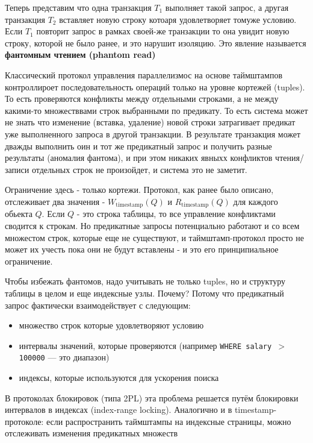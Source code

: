 Теперь представим что одна транзакция $T_1$ выполняет такой запрос, а другая транзакция $T_2$ вставляет новую строку котоаря удовлетворяет томуже условию. Если $T_1$ повторит запрос в рамках своей-же транзакции то она увидит новую строку, которой не было ранее, и это нарушит изоляцию. Это явление называется \textbf{фантомным чтением (phantom read)}

Классический протокол управления параллелизмос на основе таймштампов контроллироет последовательность операций только на уровне кортежей (tuples). То есть проверяются конфликты между отдельными строками, а не между какими-то множестввами строк выбранными по предикату.
То есть система может не знать что изменение (вставка, удаление) новой строки затрагивает предикат уже выполненного запроса в другой транзакции. В результате транзакция может дважды выполнить оин и тот же предикатный запрос и получить разные результаты (аномалия фантома), и при этом никаких явныхх конфликтов чтения/записи отдельных строк не произойдет, и система это не заметит.

Ограничение здесь - только кортежи. Протокол, как ранее было описано, отслеживает два значения - $W_{\text{timestamp}}(Q)$ и $R_{\text{timestamp}}(Q)$ для каждого обьекта $Q$. Если $Q$ - это строка таблицы, то все управление конфликтами сводится к строкам. Но предикатные запросы потенциально работают и со всем множестом строк, которые еще не существуют, и таймштамп-протокол просто не может их учесть пока они не будут вставлены - и это его принципиальное ограничение.

Чтобы избежать фантомов, надо учитывать не только tuples, но и структуру таблицы в целом и еще индексные узлы. Почему?
Потому что предикатный запрос фактически взаимодействует с следующим:
\begin{itemize}
    \item множество строк которые удовлетворяют условию
    \item интервалы значений, которые проверяются (например \texttt{WHERE salary $>$ 100000} — это диапазон)
    \item индексы, которые используются для ускорения поиска
\end{itemize}

В протоколах блокировок (типа 2PL) эта проблема решается путём блокировки интервалов в индексах (index-range locking). Аналогично и в timestamp-протоколе: если распространить таймштампы на индексные страницы, можно отслеживать изменения предикатных множеств \autocite{Silberschatz, ElmasriNavathe}

